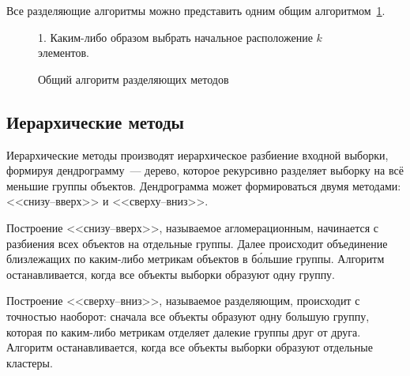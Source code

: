 Все разделяющие алгоритмы можно представить одним общим алгоритмом~\ref{alg:EM}.
\begin{figure}[ht!]
    \begin{algorithm}[H]
        1. Каким-либо образом выбрать начальное расположение \( k \) элементов. 
    \end{algorithm}
    \vspace*{-1.5em}
    \caption{Общий алгоритм разделяющих методов}
    \label{alg:EM}
\end{figure}

\subsection{Иерархические методы}
Иерархические методы производят иерархическое разбиение входной выборки, формируя дендрограмму~--- дерево, которое рекурсивно разделяет выборку на всё меньшие группы объектов. Дендрограмма может формироваться двумя методами: <<снизу--вверх>> и <<сверху--вниз>>.

Построение <<снизу--вверх>>, называемое агломерационным, начинается с разбиения всех объектов на отдельные группы. Далее происходит объединение близлежащих по каким-либо метрикам объектов в б\'{о}льшие группы. Алгоритм останавливается, когда все объекты выборки образуют одну группу.

Построение <<сверху--вниз>>, называемое разделяющим, происходит с точностью наоборот: сначала все объекты образуют одну большую группу, которая по каким-либо метрикам отделяет далекие группы друг от друга. Алгоритм останавливается, когда все объекты выборки образуют отдельные кластеры.

